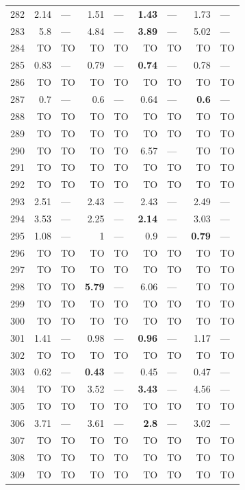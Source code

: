 \begin{longtable}{lr@{\hskip 4pt}l@{\hskip 12pt}r@{\hskip 4pt}l@{\hskip 12pt}r@{\hskip 4pt}l@{\hskip 12pt}r@{\hskip 4pt}l@{\hskip 12pt}}
282 & 2.14 & --- & 1.51 & --- & \textbf{1.43} & --- & 1.73 & --- \\
283 & 5.8 & --- & 4.84 & --- & \textbf{3.89} & --- & 5.02 & --- \\
284 & TO & TO & TO & TO & TO & TO & TO & TO \\
285 & 0.83 & --- & 0.79 & --- & \textbf{0.74} & --- & 0.78 & --- \\
286 & TO & TO & TO & TO & TO & TO & TO & TO \\
287 & 0.7 & --- & 0.6 & --- & 0.64 & --- & \textbf{0.6} & --- \\
288 & TO & TO & TO & TO & TO & TO & TO & TO \\
289 & TO & TO & TO & TO & TO & TO & TO & TO \\
290 & TO & TO & TO & TO & 6.57 & --- & TO & TO \\
291 & TO & TO & TO & TO & TO & TO & TO & TO \\
292 & TO & TO & TO & TO & TO & TO & TO & TO \\
293 & 2.51 & --- & 2.43 & --- & 2.43 & --- & 2.49 & --- \\
294 & 3.53 & --- & 2.25 & --- & \textbf{2.14} & --- & 3.03 & --- \\
295 & 1.08 & --- & 1 & --- & 0.9 & --- & \textbf{0.79} & --- \\
296 & TO & TO & TO & TO & TO & TO & TO & TO \\
297 & TO & TO & TO & TO & TO & TO & TO & TO \\
298 & TO & TO & \textbf{5.79} & --- & 6.06 & --- & TO & TO \\
299 & TO & TO & TO & TO & TO & TO & TO & TO \\
300 & TO & TO & TO & TO & TO & TO & TO & TO \\
301 & 1.41 & --- & 0.98 & --- & \textbf{0.96} & --- & 1.17 & --- \\
302 & TO & TO & TO & TO & TO & TO & TO & TO \\
303 & 0.62 & --- & \textbf{0.43} & --- & 0.45 & --- & 0.47 & --- \\
304 & TO & TO & 3.52 & --- & \textbf{3.43} & --- & 4.56 & --- \\
305 & TO & TO & TO & TO & TO & TO & TO & TO \\
306 & 3.71 & --- & 3.61 & --- & \textbf{2.8} & --- & 3.02 & --- \\
307 & TO & TO & TO & TO & TO & TO & TO & TO \\
308 & TO & TO & TO & TO & TO & TO & TO & TO \\
309 & TO & TO & TO & TO & TO & TO & TO & TO \\

\end{longtable}
